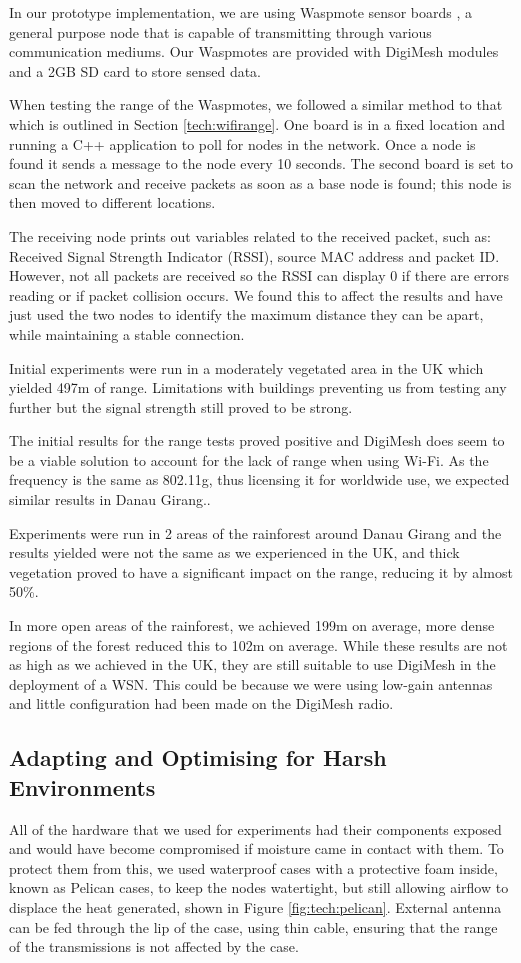 In our prototype implementation, we are using Waspmote sensor boards \cite{waspmote}, a general purpose node that is capable of transmitting through various communication mediums. Our Waspmotes are provided with DigiMesh modules and a 2GB SD card to store sensed data.
		
When testing the range of the Waspmotes, we followed a similar method to that which is outlined in Section \ref{tech:wifirange}. One board is in a fixed location and running a C++ application to poll for nodes in the network. Once a node is found it sends a message to the node every 10 seconds. The second board is set to scan the network and receive packets as soon as a base node is found; this node is then moved to different locations.
			
The receiving node prints out variables related to the received packet, such as: Received Signal Strength Indicator (RSSI), source MAC address and packet ID. However, not all packets are received so the RSSI can display 0 if there are errors reading or if packet collision occurs. We found this to affect the results and have just used the two nodes to identify the maximum distance they can be apart, while maintaining a stable connection.
					
Initial experiments were run in a moderately vegetated area in the UK which yielded 497m of range. Limitations with buildings preventing us from testing any further but the signal strength still proved to be strong.
			
The initial results for the range tests proved positive and DigiMesh does seem to be a viable solution to account for the lack of range when using Wi-Fi. As the frequency is the same as 802.11g, thus licensing it for worldwide use, we expected similar results in Danau Girang..
						
Experiments were run in 2 areas of the rainforest around Danau Girang and the results yielded were not the same as we experienced in the UK, and thick vegetation proved to have a significant impact on the range, reducing it by almost 50\%.
			
In more open areas of the rainforest, we achieved 199m on average, more dense regions of the forest reduced this to 102m on average. While these results are not as high as we achieved in the UK, they are still suitable to use DigiMesh in the deployment of a WSN. This could be because we were using low-gain antennas and little configuration had been made on the DigiMesh radio.

\subsection{Adapting and Optimising for Harsh Environments}
	All of the hardware that we used for experiments had their components exposed and would have become compromised if moisture came in contact with them. To protect them from this, we used waterproof cases with a protective foam inside, known as Pelican cases, to keep the nodes watertight, but still allowing airflow to displace the heat generated, shown in Figure \ref{fig:tech:pelican}.
	External antenna can be fed through the lip of the case, using thin cable, ensuring that the range of the transmissions is not affected by the case. 

